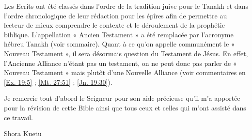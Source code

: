 \begin{small}
Les Ecrits ont été classés dans l'ordre de la tradition juive pour le Tanakh et dans l'ordre chronologique de leur rédaction pour les épîres afin de permettre au lecteur de mieux comprendre le contexte et le déroulement de la prophétie biblique. L'appellation « Ancien Testament » a été remplacée par l'acronyme hébreu Tanakh (voir sommaire). Quant à ce qu'on appelle communément le « Nouveau Testament », il sera désormais question du Testament de Jésus. En effet, l'Ancienne Alliance n'étant pas un testament, on ne peut donc pas parler de « Nouveau Testament » mais plutôt d'une Nouvelle Alliance (voir commentaires en \vref{Ex. 19:5} ; \vref{Mt. 27:51} ; \vref{Jn. 19:30}).

Je remercie tout d'abord le Seigneur pour son aide précieuse qu'il m'a apportée pour la révision de cette Bible ainsi que tous ceux et celles qui m'ont assisté dans ce travail.

Shora Kuetu
\end{small}

